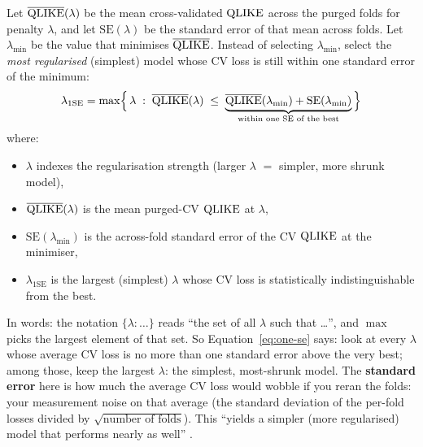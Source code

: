\begin{keyidea}
Let $\overline{\operatorname{QLIKE}}(\lambda)$ be the mean cross-validated $\operatorname{QLIKE}$ across the purged folds for penalty $\lambda$, and let $\mathrm{SE}(\lambda)$ be the standard error of that mean across folds.
Let $\lambda_{\min}$ be the value that minimises $\overline{\operatorname{QLIKE}}$.
Instead of selecting $\lambda_{\min}$, select the \emph{most regularised} (simplest) model whose CV loss is still within one standard error of the minimum:
\begin{equation}
\label{eq:one-se}
\lambda_{\text{1SE}} = \max\Bigl\{\,\lambda \;:\; \overline{\operatorname{QLIKE}}(\lambda) \;\leq\; \underbrace{\overline{\operatorname{QLIKE}}(\lambda_{\min}) + \mathrm{SE}(\lambda_{\min})}_{\text{within one SE of the best}} \,\Bigr\}
\end{equation}
where:
\begin{itemize}[nosep]
  \item $\lambda$ indexes the regularisation strength (larger $\lambda$ $=$ simpler, more shrunk model),
  \item $\overline{\operatorname{QLIKE}}(\lambda)$ is the mean purged-CV $\operatorname{QLIKE}$ at $\lambda$,
  \item $\mathrm{SE}(\lambda_{\min})$ is the across-fold standard error of the CV $\operatorname{QLIKE}$ at the minimiser,
  \item $\lambda_{\text{1SE}}$ is the largest (simplest) $\lambda$ whose CV loss is statistically indistinguishable from the best.
\end{itemize}
In words: the notation $\{\lambda : \ldots\}$ reads ``the set of all $\lambda$ such that \ldots'', and $\max$ picks the largest element of that set. So Equation~\eqref{eq:one-se} says: look at every $\lambda$ whose average CV loss is no more than one standard error above the very best; among those, keep the largest $\lambda$: the simplest, most-shrunk model.
The \textbf{standard error} here is how much the average CV loss would wobble if you reran the folds: your measurement noise on that average (the standard deviation of the per-fold losses divided by $\sqrt{\text{number of folds}}$).
This ``yields a simpler (more regularised) model that performs nearly as well'' \citep[the one-standard-error rule predates this source, originating with Breiman et al.\ (CART, 1984) and Hastie, Tibshirani \& Friedman, ESL;][applies it in the purged-CV setting]{LopezdePrado2018}.
\end{keyidea}

